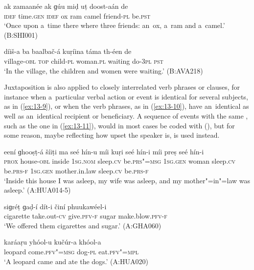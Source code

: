 \ex
\label{ex:13-7}
\gll ak zamaanée {\ob}ak ɡúu miḍ uṭ{\cb} doost-aán de \\
\textsc{idef} time.\textsc{gen} \textsc{ idef} ox ram camel friend-\textsc{pl}  be.\textsc{pst}  \\
\glt `Once upon a~time there where three friends: an~ox, a~ram and a~camel.' (B:SHI001)

\ex
\label{ex:13-8}
\gll díiš-a ba {\ob}baalbač-á kuṛíina{\cb} táma th-éen de \\
village-\textsc{obl} \textsc{top} child-\textsc{pl} woman.\textsc{pl} waiting do-\textsc{3pl} \textsc{pst}  \\
\glt `In the village, the children and women were waiting.' (B:AVA218) 
\z

Juxtaposition is also applied to closely interrelated verb phrases or clauses, for instance when a~particular verbal action or event is identical for several subjects, as in (\ref{ex:13-9}), or when the verb phrases, as in (\ref{ex:13-10}), have an~identical  as well as an~identical recipient or beneficiary. A sequence of events with the same , such as the one in (\ref{ex:13-11}), would in most cases be coded with  (), but for some reason, maybe reflecting how upset the speaker is,  is used instead.

\ea
\label{ex:13-9}
\gll eení ɡhooṣṭ-á šíiṭi {\ob}ma seé hín-u míi kuṛi seé hín-i míi preṣ seé hín-i{\cb}\\
\textsc{prox} house-\textsc{obl} inside \textsc{1sg.nom} sleep.\textsc{cv} be.\textsc{prs"=msg}  \textsc{1sg.gen} woman sleep.\textsc{cv} be.\textsc{prs-f } \textsc{1sg.gen} mother.in.law sleep.\textsc{cv} be.\textsc{prs-f} \\
\glt `Inside this house I was asleep, my wife was asleep, and my mother"=in"=law was asleep.' (A:HUA014-5)

\ex
\label{ex:13-10}
\gll siɡréṭ ɡaḍ-í dít-i činí phuukawéel-i\\
cigarette take.out-\textsc{cv} give.\textsc{pfv-f} sugar make.blow.\textsc{pfv-f} \\
\glt `We offered them cigarettes and sugar.' (A:GHA060)

\ex
\label{ex:13-11}
\gll karáaṛu yhóol-u kučúr-a khóol-a  \\
leopard come.\textsc{pfv"=msg} dog-\textsc{pl} eat.\textsc{pfv"=mpl} \\
\glt `A leopard came and ate the dogs.' (A:HUA020) 
\z

